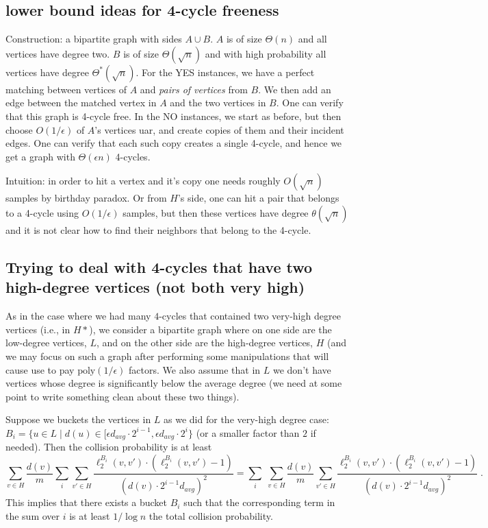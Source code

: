 \documentclass{article}
\newcommand{\eps}{\epsilon}
\newcommand{\davg}{d_{avg}}
\newcommand{\poly}{\textrm{poly}}
\begin{document}
\fi



\subsection{lower bound ideas for 4-cycle freeness}
Construction: a bipartite graph with sides $A\cup B$. $A$ is of size $\Theta(n)$ and all vertices have degree two. $B$ is of size $\Theta(\sqrt n)$ and with high probability all vertices have degree $\Theta^*(\sqrt n)$.
For the YES instances,  we have a perfect matching between vertices of $A$ and \emph{pairs of vertices} from $B$. We then add an edge between the matched vertex in $A$ and the two vertices in $B$. One can verify that this graph is 4-cycle free.
In the NO instances, we start as before, but then choose $O(1/\eps)$ of $A$'s vertices uar, and create copies of them and their incident edges. One can verify that each such copy creates a single 4-cycle, and hence we get a graph with $\Theta(\eps n)$ 4-cycles.

Intuition: in order to hit a vertex and it's copy one needs roughly $O(\sqrt n)$ samples by birthday paradox. Or from $H$'s side, one can hit a pair that belongs to a 4-cycle using $O(1/\eps)$ samples, but then these vertices have degree $\theta(\sqrt n)$ and it is not clear how to find their neighbors that belong to the 4-cycle.

\subsection*{Trying to deal with 4-cycles that have two  high-degree vertices (not both very high)}

As in the case where we had many $4$-cycles that contained two very-high degree vertices (i.e., in $H*$), we consider a bipartite graph where on one side are the low-degree vertices, $L$, and on the other side are the high-degree vertices, $H$ (and we may focus on such a graph after performing some manipulations that will cause use to pay $\poly(1/\eps)$ factors. We also assume that in $L$ we don't have vertices whose degree is significantly below the average degree (we need at some point to write something clean about these two things).

Suppose we buckets the vertices in $L$ as we did for the very-high degree case: $B_i=\{u\in L \mid d(u)\in [\eps\davg\cdot 2^{i-1}, \eps\davg\cdot 2^i \}$ (or a smaller factor than $2$ if needed). Then the collision probability is at least
\begin{equation}\sum_{v\in H} \frac{d(v)}{m} \sum_i \sum_{v'\in H} \frac{\ell_2^{B_i}(v,v')\cdot (\ell_2^{B_i}(v,v')-1)}{(d(v)\cdot 2^{i-1}\davg)^2} =
\sum_i \; \sum_{v\in H} \frac{d(v)}{m} \sum_{v'\in H} \frac{\ell_2^{B_i}(v,v')\cdot (\ell_2^{B_i}(v,v')-1)}{(d(v)\cdot 2^{i-1}\davg)^2}
\;.
\end{equation}
This implies that there exists a bucket $B_i$ such that the corresponding term in the sum over $i$ is at least $1/\log n$ the total collision probability.




\end{document}
